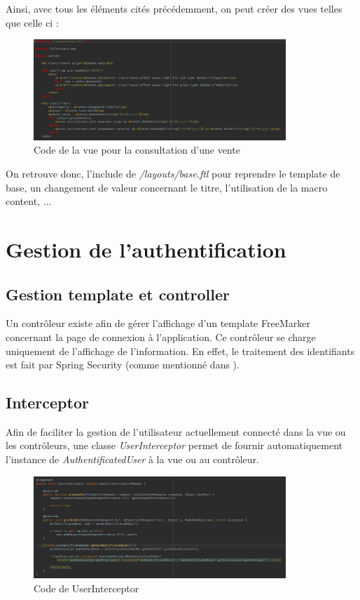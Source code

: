 				Ainsi, avec tous les éléments cités précédemment, on peut créer des vues telles que celle ci :

				\begin{figure}[H]
					\centering\includegraphics[width=0.85\textwidth, keepaspectratio]{res/view-venteConsulter.png}
					\caption{Code de la vue pour la consultation d'une vente}
				\end{figure}
				On retrouve donc, l'include de \textit{/layouts/base.ftl} pour reprendre le template de base, un changement de valeur concernant le titre, l'utilisation de la macro content, ...

	\section{Gestion de l'authentification}

		\subsection{Gestion template et controller}

			Un contrôleur existe afin de gérer l'affichage d'un template FreeMarker concernant la page de connexion à l'application. Ce contrôleur se charge uniquement de l'affichage de l'information. En effet, le traitement des identifiants est fait par Spring Security (comme mentionné dans ).

		\subsection{Interceptor}
			\label{subsec:interceptor}

			Afin de faciliter la gestion de l'utilisateur actuellement connecté dans la vue ou les contrôleurs, une classe \textit{UserInterceptor} permet de fournir automatiquement l'instance de \textit{AuthentificatedUser} à la vue ou au contrôleur.

			\begin{figure}[H]
				\centering\includegraphics[width=0.85\textwidth, keepaspectratio]{res/UserInterceptor.png}
				\caption{Code de UserInterceptor}
			\end{figure}


